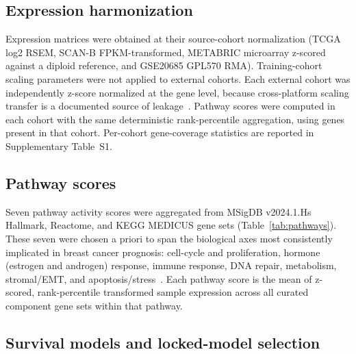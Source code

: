 \documentclass[11pt,letterpaper]{article}
\begin{document}
\subsection*{Expression harmonization}

Expression matrices were obtained at their source-cohort normalization (TCGA log2 RSEM, SCAN-B FPKM-transformed, METABRIC microarray z-scored against a diploid reference, and GSE20685 GPL570 RMA). Training-cohort scaling parameters were not applied to external cohorts. Each external cohort was independently z-score normalized at the gene level, because cross-platform scaling transfer is a documented source of leakage~\cite{borisov2022transcriptomic}. Pathway scores were computed in each cohort with the same deterministic rank-percentile aggregation, using genes present in that cohort. Per-cohort gene-coverage statistics are reported in Supplementary Table~S1.

\subsection*{Pathway scores}

Seven pathway activity scores were aggregated from MSigDB v2024.1.Hs Hallmark, Reactome, and KEGG MEDICUS gene sets (Table~\ref{tab:pathways}). These seven were chosen a priori to span the biological axes most consistently implicated in breast cancer prognosis: cell-cycle and proliferation, hormone (estrogen and androgen) response, immune response, DNA repair, metabolism, stromal/EMT, and apoptosis/stress~\cite{hanahan2011hallmarks,salgado2015tils,liberzon2015hallmark}. Each pathway score is the mean of z-scored, rank-percentile transformed sample expression across all curated component gene sets within that pathway.

\subsection*{Survival models and locked-model selection}
\end{document}
